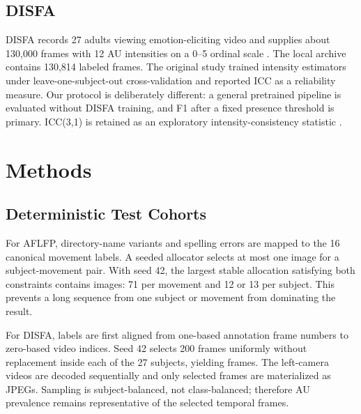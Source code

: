 \documentclass[10pt,journal]{IEEEtran}
\begin{document}
\subsection{DISFA}

DISFA records 27 adults viewing emotion-eliciting video and supplies about
130,000 frames with 12 AU intensities on a 0--5 ordinal scale
\cite{mavadati2013disfa}. The local archive contains 130,814 labeled frames.
The original study trained intensity estimators under leave-one-subject-out
cross-validation and reported ICC as a reliability measure. Our protocol is
deliberately different: a general pretrained pipeline is evaluated without
DISFA training, and F1 after a fixed presence threshold is primary. ICC(3,1)
is retained as an exploratory intensity-consistency statistic
\cite{shrout1979icc}.

\section{Methods}

\subsection{Deterministic Test Cohorts}

For AFLFP, directory-name variants and spelling errors are mapped to the 16
canonical movement labels. A seeded allocator selects at most one image for a
subject-movement pair. With seed 42, the largest stable allocation satisfying
both constraints contains \AFLFPSamples{} images: 71 per movement and 12 or
13 per subject. This prevents a long sequence from one subject or movement
from dominating the result.

For DISFA, labels are first aligned from one-based annotation frame numbers to
zero-based video indices. Seed 42 selects 200 frames uniformly without
replacement inside each of the 27 subjects, yielding \DISFASamples{} frames.
The left-camera videos are decoded sequentially and only selected frames are
materialized as JPEGs. Sampling is subject-balanced, not class-balanced;
therefore AU prevalence remains representative of the selected temporal
frames.

\begin{table}[t]
\caption{Headline test-only results. Accuracy metrics are task-specific and
must not be compared across rows. Throughput excludes model initialization
and DISFA frame decoding.}
\label{tab:headline}
\centering
\small

\end{table}
\end{document}
